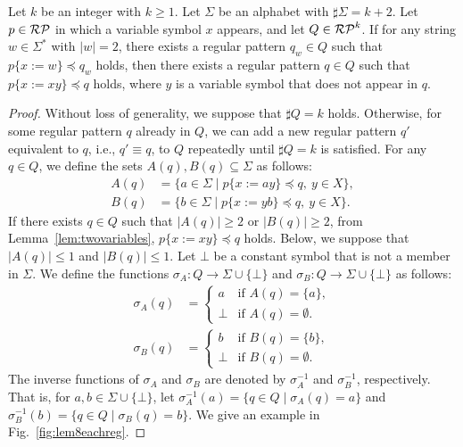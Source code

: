 \begin{lem}\label{Add-Lemma01}%
Let $k$ be an integer with $k\geq 1$.
Let $\Sigma$ be an alphabet with $\sharp \Sigma = k + 2$.
Let $p \in \mathcal{RP}$ in which a variable symbol $x$ appears, and let $Q \in \mathcal{RP}^{k}$.
If for any string $w \in \Sigma^{\ast}$ with $|w|=2$, there exists a regular pattern $q_{w} \in Q$ such that $p \{ x:=w \} \preceq q_{w}$ holds, then there exists a regular pattern $q \in Q$ such that $p \{ x:=xy \} \preceq q$ holds, where $y$ is a variable symbol that does not appear in $q$.
\end{lem}

\begin{proof}
Without loss of generality, we suppose that $\sharp Q = k$ holds. Otherwise, for some regular pattern $q$ already in $Q$, we can add a new regular pattern $q'$ equivalent to $q$, i.e., $q' \equiv q$, to $Q$ repeatedly until $\sharp Q = k$ is satisfied.
For any $q \in Q$, we define the sets $A(q), B(q) \subseteq \Sigma$ as follows:
\begin{align*}
  A(q) & = \{ a \in \Sigma \mid p \{ x:=ay \} \preceq q,\ y\in X\},\\ 
  B(q) & = \{ b \in \Sigma \mid p \{ x:=yb \} \preceq q,\ y\in X\}.
  \end{align*}
If there exists $q\in Q$ such that $|A(q)|\geq 2$ or $|B(q)|\geq 2$, from Lemma~\ref{lem:twovariables}, $p\{x := xy\} \preceq q$ holds.
Below, we suppose that $|A(q)|\leq 1$ and $|B(q)|\leq 1$.
Let $\bot$ be a constant symbol that is not a member in $\Sigma$.
We define the functions $\sigma_{A}: Q \rightarrow \Sigma \cup \{\bot\}$ and $\sigma_{B}: Q \rightarrow \Sigma \cup \{\bot\}$ as follows:
\begin{align*}
  \sigma_{A}(q) & =
  \begin{cases}
    a & \textrm{if } A(q) = \{a\}, \\
    \bot & \textrm{if } A(q) = \emptyset.
  \end{cases}\\
  \sigma_{B}(q) & =
  \begin{cases}
    b & \textrm{if } B(q) = \{b\}, \\
    \bot & \textrm{if } B(q) = \emptyset.
  \end{cases}
\end{align*}
The inverse functions of $\sigma_{A}$ and $\sigma_{B}$ are denoted by $\sigma_{A}^{-1}$ and $\sigma_{B}^{-1}$, respectively. That is, for $a,b \in \Sigma \cup \{\bot\}$, let $\sigma_{A}^{-1}(a) = \{q \in Q \mid \sigma_{A}(q) = a\}$ and $\sigma_{B}^{-1}(b) = \{q \in Q \mid \sigma_{B}(q) = b\}$. 
We give an example in Fig.~\ref{fig:lem8eachreg}.


\end{proof}
